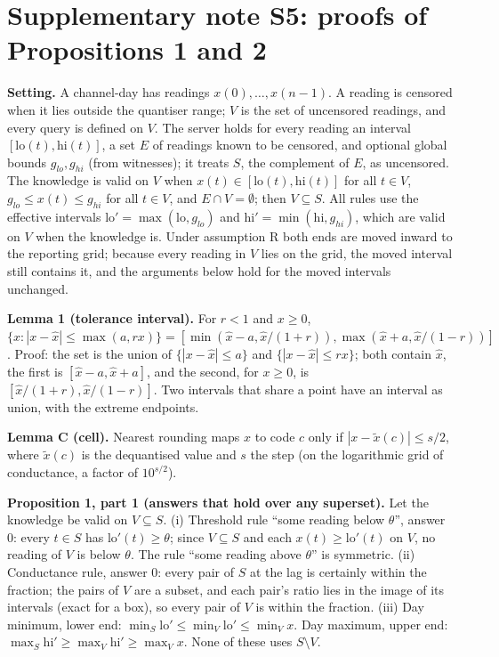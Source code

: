﻿\documentclass[12pt]{article}
\begin{document}
\section*{Supplementary note S5: proofs of Propositions 1 and 2}
\textbf{Setting.} A channel-day has readings $x(0), \dots, x(n-1)$. A reading is censored when it lies outside the quantiser range; $V$ is the set of uncensored readings, and every query is defined on $V$. The server holds for every reading an interval $[\mathrm{lo}(t), \mathrm{hi}(t)]$, a set $E$ of readings known to be censored, and optional global bounds $g_{lo}, g_{hi}$ (from witnesses); it treats $S$, the complement of $E$, as uncensored. The knowledge is valid on $V$ when $x(t) \in [\mathrm{lo}(t), \mathrm{hi}(t)]$ for all $t \in V$, $g_{lo} \le x(t) \le g_{hi}$ for all $t \in V$, and $E \cap V = \emptyset$; then $V \subseteq S$. All rules use the effective intervals $\mathrm{lo}' = \max(\mathrm{lo}, g_{lo})$ and $\mathrm{hi}' = \min(\mathrm{hi}, g_{hi})$, which are valid on $V$ when the knowledge is. Under assumption R both ends are moved inward to the reporting grid; because every reading in $V$ lies on the grid, the moved interval still contains it, and the arguments below hold for the moved intervals unchanged.

\textbf{Lemma 1 (tolerance interval).} For $r < 1$ and $x \ge 0$, $\{x : |x - \hat{x}| \le \max(a, rx)\} = [\min(\hat{x} - a, \hat{x}/(1+r)), \max(\hat{x} + a, \hat{x}/(1-r))]$. Proof: the set is the union of $\{|x - \hat{x}| \le a\}$ and $\{|x - \hat{x}| \le rx\}$; both contain $\hat{x}$, the first is $[\hat{x} - a, \hat{x} + a]$, and the second, for $x \ge 0$, is $[\hat{x}/(1+r), \hat{x}/(1-r)]$. Two intervals that share a point have an interval as union, with the extreme endpoints.

\textbf{Lemma C (cell).} Nearest rounding maps $x$ to code $c$ only if $|x - \tilde{x}(c)| \le s/2$, where $\tilde{x}(c)$ is the dequantised value and $s$ the step (on the logarithmic grid of conductance, a factor of $10^{s/2}$).

\textbf{Proposition 1, part 1 (answers that hold over any superset).} Let the knowledge be valid on $V \subseteq S$. (i) Threshold rule ``some reading below $\theta$'', answer 0: every $t \in S$ has $\mathrm{lo}'(t) \ge \theta$; since $V \subseteq S$ and each $x(t) \ge \mathrm{lo}'(t)$ on $V$, no reading of $V$ is below $\theta$. The rule ``some reading above $\theta$'' is symmetric. (ii) Conductance rule, answer 0: every pair of $S$ at the lag is certainly within the fraction; the pairs of $V$ are a subset, and each pair's ratio lies in the image of its intervals (exact for a box), so every pair of $V$ is within the fraction. (iii) Day minimum, lower end: $\min_{S} \mathrm{lo}' \le \min_{V} \mathrm{lo}' \le \min_{V} x$. Day maximum, upper end: $\max_{S} \mathrm{hi}' \ge \max_{V} \mathrm{hi}' \ge \max_{V} x$. None of these uses $S \setminus V$.
\end{document}
